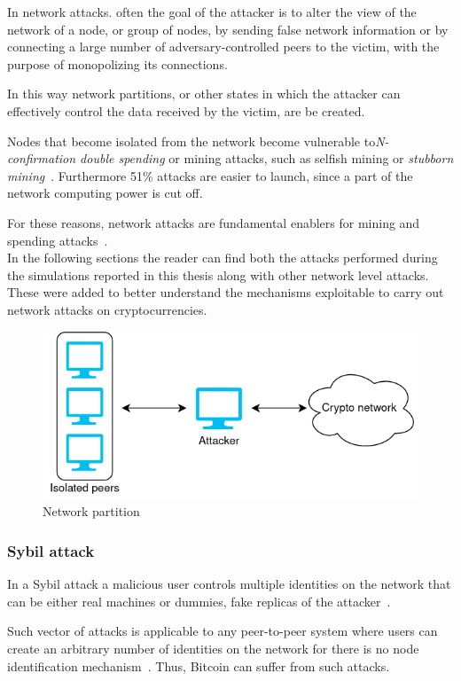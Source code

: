 \documentclass[12pt, letterpaper, twoside]{article}
\begin{document}
In network attacks. often the goal of the attacker is to alter the view of the network of a node, or group of nodes, by sending false network information or by connecting a large number of adversary-controlled peers to the victim, with the purpose of monopolizing its connections.

In this way network partitions, or other states in which the attacker can effectively control the data received by the victim, are be created.

Nodes that become isolated from the network become vulnerable to\textit{N-confirmation double spending} or mining attacks, such as selfish mining or \textit{stubborn mining}~\cite{stubborn}. Furthermore 51\% attacks are easier to launch, since a part of the network computing power is cut off. 

For these reasons, network attacks are fundamental enablers for mining and spending attacks~\cite{dotan2020surveychallenges}.\\

In the following sections the reader can find both the attacks performed during the simulations reported in this thesis along with other network level attacks. These were added to better understand the mechanisms exploitable to carry out network attacks on cryptocurrencies.

\begin{figure}[h!]
	\includegraphics[width=.55\textwidth]{pict/network-partition.png}
	\centering
	\caption{Network partition}
	\label{fig:net-part}
\end{figure}


\subsubsection{Sybil attack}\label{sec:sybil}
In a Sybil attack a malicious user controls multiple identities on the network that can be either real machines or dummies, fake replicas of the attacker~\cite{douceur2002sybil}.

Such vector of attacks is applicable to any peer-to-peer system where users can create an arbitrary number of identities on the network for there is no node identification mechanism~\cite{kedziora-sybil-ledgers}. Thus, Bitcoin can suffer from such attacks.
\end{document}
